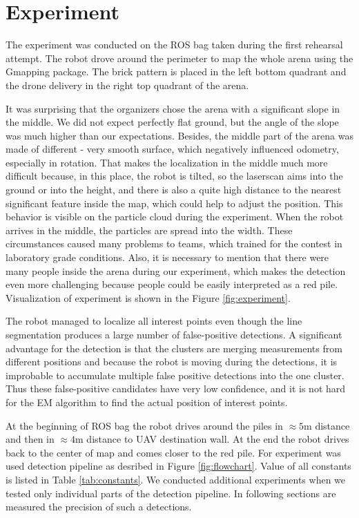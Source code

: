 \chapter{Experiment}

The experiment was conducted on the ROS bag taken during the first rehearsal attempt. The robot drove around the perimeter to map the whole arena using the Gmapping package. The brick pattern is placed in the left bottom quadrant and the drone delivery in the right top quadrant of the arena.

 It was surprising that the organizers chose the arena with a significant slope in the middle. We did not expect perfectly flat ground, but the angle of the slope was much higher than our expectations. Besides, the middle part of the arena was made of different - very smooth surface, which negatively influenced odometry, especially in rotation. That makes the localization in the middle much more difficult because, in this place, the robot is tilted, so the laserscan aims into the ground or into the height, and there is also a quite high distance to the nearest significant feature inside the map, which could help to adjust the position. This behavior is visible on the particle cloud during the experiment. When the robot arrives in the middle, the particles are spread into the width. These circumstances caused many problems to teams, which trained for the contest in laboratory grade conditions. Also, it is necessary to mention that there were many people inside the arena during our experiment, which makes the detection even more challenging because people could be easily interpreted as a red pile. Visualization of experiment is shown in the Figure \ref{fig:experiment}.

The robot managed to localize all interest points even though the line segmentation produces a large number of false-positive detections. A significant advantage for the detection is that the clusters are merging measurements from different positions and because the robot is moving during the detections, it is improbable to accumulate multiple false positive detections into the one cluster. Thus these false-positive candidates have very low confidence, and it is not hard for the EM algorithm to find the actual position of interest points. 

At the beginning of ROS bag the robot drives around the piles in $\approx 5$m distance and then in $\approx 4$m distance to UAV destination wall. At the end the robot drives back to the center of map and comes closer to the red pile. For experiment was used detection pipeline as desribed in Figure \ref{fig:flowchart}. Value of all constants is listed in Table \ref{tab:constants}. We conducted additional experiments when we tested only individual parts of the detection pipeline. In following sections are measured the precision of such a detections.


